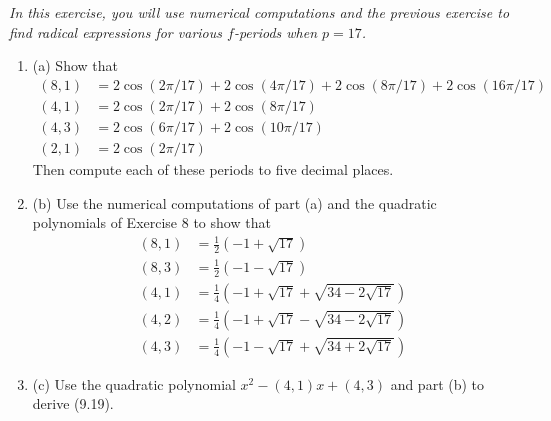 \documentclass[11pt,a4paper]{article}
\newcommand{\be} {\begin{enumerate}}
\newcommand{\ee} {\end{enumerate}}
\begin{document}
{\it In this exercise, you will use numerical computations and the previous exercise to find radical expressions for various $f$-periods when $p=17$.
\be
\item[(a)] Show that
\begin{align*}
(8,1) &=  2\cos(2\pi/17) + 2\cos(4\pi/17)+2\cos(8\pi/17)+2\cos(16\pi/17)\\
(4,1) &= 2\cos(2\pi/17)+2\cos(8\pi/17)\\
(4,3) &= 2\cos(6\pi/17)+2\cos(10\pi/17)\\
(2,1) &= 2\cos(2\pi/17)
\end{align*}
Then compute each of these periods to five decimal places.
\item[(b)] Use the numerical computations of part (a) and the quadratic polynomials of Exercise 8 to show that
\begin{align*}
(8,1) &= \frac{1}{2}\left(-1+\sqrt{17}\right)\\
(8,3) &= \frac{1}{2}\left(-1-\sqrt{17}\right)\\
(4,1) &= \frac{1}{4} \left(-1+\sqrt{17} +\sqrt{34-2\sqrt{17}}\right)\\
(4,2) &= \frac{1}{4} \left(-1+\sqrt{17} - \sqrt{34-2\sqrt{17}}\right)\\
(4,3) &= \frac{1}{4} \left(-1-\sqrt{17} +\sqrt{34+2\sqrt{17}}\right)
\end{align*}

\item[(c)] Use the quadratic polynomial $x^2 - (4,1) x + (4,3)$ and part (b) to derive (9.19).
\ee
}
\end{document}
